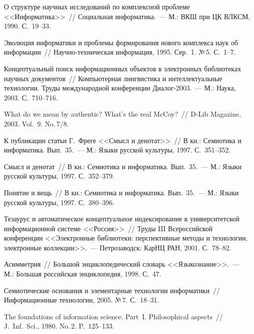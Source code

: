 \begin{multicols}{2}
{{\begin{thebibliography}{99}
     О структуре научных исследований по комплексной проблеме <<Информатика>>~// 
Социальная информатика.~--- М.: ВКШ при ЦК ВЛКСМ, 1990. С.~19--33.
     
     Эволюция информатики и проблемы формирования нового комплекса наук об 
информации~// Научно-техническая информация, 1995. Сер.~1. №\,5. С.~1--7.
     
     Концептуальный поиск информационных объектов в электронных библиотеках 
научных документов~// Компьютерная лингвистика и интеллектуальные технологии. Труды 
международной конференции Диалог-2003.~--- М.: Наука, 2003. С.~710--716.
     
     What do we mean by authentic? What's the real McCoy?~// D-Lib Magazine, 2003. Vol.~9. 
No.\,7/8.
     
     К публикации статьи Г.~Фреге <<Смысл и денотат>>~// В кн.: Семиотика и 
информатика. Вып.~35.~--- М.: Языки русской культуры, 1997. С.~351--352.
     
     Смысл и денотат~// В кн.: Семиотика и информатика. Вып.~35.~--- М.: Языки русской 
культуры, 1997. С.~352--379.
     
     Понятие и вещь~// В кн.: Семиотика и информатика. Вып.~35.~--- М.: Языки русской 
культуры, 1997. С.~380--396.
     
     Тезаурус и автоматическое концептуальное индексирование в университетской 
информационной системе <<Россия>>~// Труды III Всероссийской конференции 
<<Электронные библиотеки: перспективные методы и технологии, электронные 
коллекции>>.~--- Петрозаводск: КарНЦ РАН, 2001. С.~78--82.
     
     Асимметрия~// Большой энциклопедический словарь <<Языкознание>>.~--- М.: 
Большая российская энциклопедия, 1998. С.~47.
     
     Семиотические основания и элементарные технологии информатики~// 
Информационные технологии, 2005. №\,7. С.~18--31.
     
     The foundations of information science. Part~I. Philosophical aspects~// J.\ Inf.\ 
Sci., 1980. No.\,2. P.~125--133.
     

\end{thebibliography}}}
\end{multicols}
